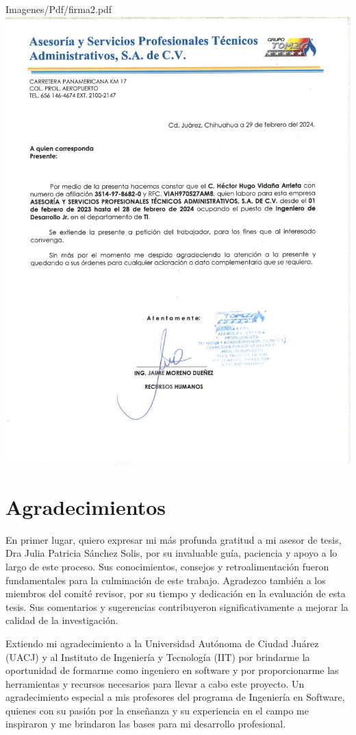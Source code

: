 \documentclass[final, fmstyle, 12pt]{article}
\begin{document}
\begin{center}
{Imagenes/Pdf/firma2.pdf}
\includegraphics[scale=0.8]{Imagenes/Pdf/firma3.pdf}
\end{center}

\section{Agradecimientos}
\setlength{\parskip}{1em}
En primer lugar, quiero expresar mi más profunda gratitud a mi asesor de tesis, Dra Julia Patricia Sánchez Solis, por su invaluable guía, paciencia y apoyo a lo largo de este proceso. Sus conocimientos, consejos y retroalimentación fueron fundamentales para la culminación de este trabajo.
Agradezco también a los miembros del comité revisor, por su tiempo y dedicación en la evaluación de esta tesis. Sus comentarios y sugerencias contribuyeron significativamente a mejorar la calidad de la investigación.

Extiendo mi agradecimiento a la Universidad Autónoma de Ciudad Juárez (UACJ) y al Instituto de Ingeniería y Tecnología (IIT) por brindarme la oportunidad de formarme como ingeniero en software y por proporcionarme las herramientas y recursos necesarios para llevar a cabo este proyecto.
Un agradecimiento especial a mis profesores del programa de Ingeniería en Software, quienes con su pasión por la enseñanza y su experiencia en el campo me inspiraron y me brindaron las bases para mi desarrollo profesional.
\end{document}
